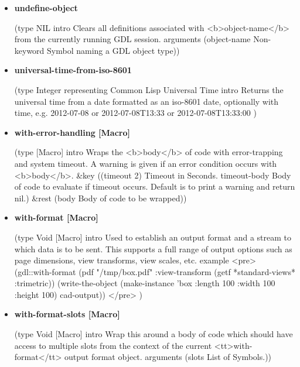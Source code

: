 \documentclass [11pt]{book}
\begin{document}
\begin{itemize}
\item {}
\label{prim:undefine-object}
\textbf{undefine-object}

(type NIL intro
  Clears all definitions associated with <b>object-name</b> from the
currently running GDL session.
 arguments (object-name Non-keyword Symbol naming a GDL object type))



\item {}
\label{prim:universal-time-from-iso-8601}
\textbf{universal-time-from-iso-8601}

(type Integer representing Common Lisp Universal Time intro
  Returns the universal time from a date formatted as
an iso-8601 date, optionally with time, e.g. 2012-07-08 or 2012-07-08T13:33 or 2012-07-08T13:33:00
)



\item {}
\label{prim:with-error-handling}
\textbf{with-error-handling [Macro]}

(type [Macro] intro
  Wraps the <b>body</b> of code with error-trapping and system timeout.
A warning is given if an error condition occurs with <b>body</b>.
 \&key
 ((timeout 2) Timeout in Seconds. timeout-body
  Body of code to evaluate if timeout occurs.
Default is to print a warning and return nil.)
 \&rest (body Body of code to be wrapped))



\item {}
\label{prim:with-format}
\textbf{with-format [Macro]}

(type Void [Macro] intro
  Used to establish an output format and a stream to which data is to be sent. This
supports a full range of output options such as page dimensions, view transforms, view scales, etc.
 example 
<pre>
 (gdl::with-format (pdf "/tmp/box.pdf" :view-transform (getf *standard-views* :trimetric)) 
    (write-the-object (make-instance 'box :length 100 :width 100 :height 100) cad-output))
</pre>
)



\item {}
\label{prim:with-format-slots}
\textbf{with-format-slots [Macro]}

(type Void [Macro] intro
  Wrap this around a body of code which should have access to multiple slots from the context
of the current <tt>with-format</tt> output format object.
 arguments (slots List of Symbols.))




\end{itemize}
\end{document}
